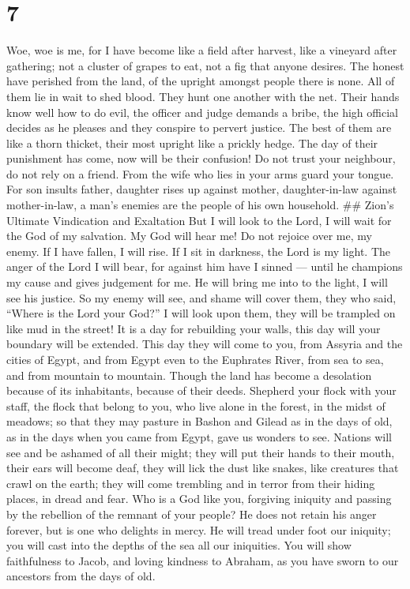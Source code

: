 \hypertarget{section-5}{%
\section{7}\label{section-5}}

 Woe, woe is me, for I have become like a field after
harvest, like a vineyard after gathering; not a cluster of grapes to
eat, not a fig that anyone desires.  The honest have
perished from the land, of the upright amongst people there is none. All
of them lie in wait to shed blood. They hunt one another with the net.
 Their hands know well how to do evil, the officer and judge
demands a bribe, the high official decides as he pleases and they
conspire to pervert justice.  The best of them are like a
thorn thicket, their most upright like a prickly hedge. The day of their
punishment has come, now will be their confusion!  Do not
trust your neighbour, do not rely on a friend. From the wife who lies in
your arms guard your tongue.  For son insults father,
daughter rises up against mother, daughter-in-law against mother-in-law,
a man's enemies are the people of his own household. \#\# Zion's
Ultimate Vindication and Exaltation  But I will look to the
Lord, I will wait for the God of my salvation. My God will hear me!
 Do not rejoice over me, my enemy. If I have fallen, I will
rise. If I sit in darkness, the Lord is my light.  The anger
of the Lord I will bear, for against him have I sinned --- until he
champions my cause and gives judgement for me. He will bring me into to
the light, I will see his justice.  So my enemy will see,
and shame will cover them, they who said, ``Where is the Lord your
God?'' I will look upon them, they will be trampled on like mud in the
street!  It is a day for rebuilding your walls, this day
will your boundary will be extended.  This day they will
come to you, from Assyria and the cities of Egypt, and from Egypt even
to the Euphrates River, from sea to sea, and from mountain to mountain.
 Though the land has become a desolation because of its
inhabitants, because of their deeds.  Shepherd your flock
with your staff, the flock that belong to you, who live alone in the
forest, in the midst of meadows; so that they may pasture in Bashon and
Gilead as in the days of old,  as in the days when you came
from Egypt, gave us wonders to see.  Nations will see and
be ashamed of all their might; they will put their hands to their mouth,
their ears will become deaf,  they will lick the dust like
snakes, like creatures that crawl on the earth; they will come trembling
and in terror from their hiding places, in dread and fear. 
Who is a God like you, forgiving iniquity and passing by the rebellion
of the remnant of your people? He does not retain his anger forever, but
is one who delights in mercy.  He will tread under foot our
iniquity; you will cast into the depths of the sea all our iniquities.
 You will show faithfulness to Jacob, and loving kindness
to Abraham, as you have sworn to our ancestors from the days of old.
